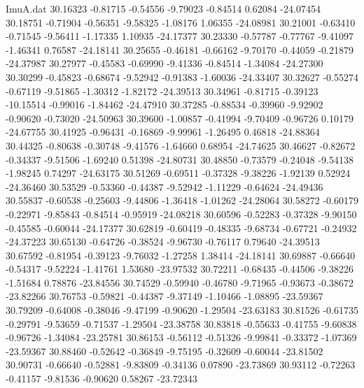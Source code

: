 \begin{filecontents}{ImuA.dat}
  30.16323   -0.81715   -0.54556   -9.79023   -0.84514    0.62084  -24.07454
  30.18751   -0.71904   -0.56351   -9.58325   -1.08176    1.06355  -24.08981
  30.21001   -0.63410   -0.71545   -9.56411   -1.17335    1.10935  -24.17377
  30.23330   -0.57787   -0.77767   -9.41097   -1.46341    0.76587  -24.18141
  30.25655   -0.46181   -0.66162   -9.70170   -0.44059   -0.21879  -24.37987
  30.27977   -0.45583   -0.69990   -9.41336   -0.84514   -1.34084  -24.27300
  30.30299   -0.45823   -0.68674   -9.52942   -0.91383   -1.60036  -24.33407
  30.32627   -0.55274   -0.67119   -9.51865   -1.30312   -1.82172  -24.39513
  30.34961   -0.81715   -0.39123  -10.15514   -0.99016   -1.84462  -24.47910
  30.37285   -0.88534   -0.39960   -9.92902   -0.90620   -0.73020  -24.50963
  30.39600   -1.00857   -0.41994   -9.70409   -0.96726    0.10179  -24.67755
  30.41925   -0.96431   -0.16869   -9.99961   -1.26495    0.46818  -24.88364
  30.44325   -0.80638   -0.30748   -9.41576   -1.64660    0.68954  -24.74625
  30.46627   -0.82672   -0.34337   -9.51506   -1.69240    0.51398  -24.80731
  30.48850   -0.73579   -0.24048   -9.54138   -1.98245    0.74297  -24.63175
  30.51269   -0.69511   -0.37328   -9.38226   -1.92139    0.52924  -24.36460
  30.53529   -0.53360   -0.44387   -9.52942   -1.11229   -0.64624  -24.49436
  30.55837   -0.60538   -0.25603   -9.44806   -1.36418   -1.01262  -24.28064
  30.58272   -0.60179   -0.22971   -9.85843   -0.84514   -0.95919  -24.08218
  30.60596   -0.52283   -0.37328   -9.90150   -0.45585   -0.60044  -24.17377
  30.62819   -0.60419   -0.48335   -9.68734   -0.67721   -0.24932  -24.37223
  30.65130   -0.64726   -0.38524   -9.96730   -0.76117    0.79640  -24.39513
  30.67592   -0.81954   -0.39123   -9.76032   -1.27258    1.38414  -24.18141
  30.69887   -0.66640   -0.54317   -9.52224   -1.41761    1.53680  -23.97532
  30.72211   -0.68435   -0.44506   -9.38226   -1.51684    0.78876  -23.84556
  30.74529   -0.59940   -0.46780   -9.71965   -0.93673   -0.38672  -23.82266
  30.76753   -0.59821   -0.44387   -9.37149   -1.10466   -1.08895  -23.59367
  30.79209   -0.64008   -0.38046   -9.47199   -0.90620   -1.29504  -23.63183
  30.81526   -0.61735   -0.29791   -9.53659   -0.71537   -1.29504  -23.38758
  30.83818   -0.55633   -0.41755   -9.60838   -0.96726   -1.34084  -23.25781
  30.86153   -0.56112   -0.51326   -9.99841   -0.33372   -1.07369  -23.59367
  30.88460   -0.52642   -0.36849   -9.75195   -0.32609   -0.60044  -23.81502
  30.90731   -0.66640   -0.52881   -9.83809   -0.34136    0.07890  -23.73869
  30.93112   -0.72263   -0.41157   -9.81536   -0.90620    0.58267  -23.72343

\end{filecontents}
